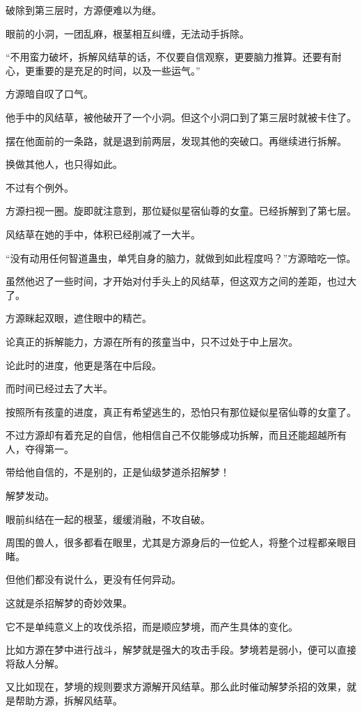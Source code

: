 \begin{this_body}
破除到第三层时，方源便难以为继。

眼前的小洞，一团乱麻，根茎相互纠缠，无法动手拆除。

“不用蛮力破坏，拆解风结草的话，不仅要自信观察，更要脑力推算。还要有耐心，更重要的是充足的时间，以及一些运气。”

方源暗自叹了口气。

他手中的风结草，被他破开了一个小洞。但这个小洞口到了第三层时就被卡住了。

摆在他面前的一条路，就是退到前两层，发现其他的突破口。再继续进行拆解。

换做其他人，也只得如此。

不过有个例外。

方源扫视一圈。旋即就注意到，那位疑似星宿仙尊的女童。已经拆解到了第七层。

风结草在她的手中，体积已经削减了一大半。

“没有动用任何智道蛊虫，单凭自身的脑力，就做到如此程度吗？”方源暗吃一惊。

虽然他迟了一些时间，才开始对付手头上的风结草，但这双方之间的差距，也过大了。

方源眯起双眼，遮住眼中的精芒。

论真正的拆解能力，方源在所有的孩童当中，只不过处于中上层次。

论此时的进度，他更是落在中后段。

而时间已经过去了大半。

按照所有孩童的进度，真正有希望逃生的，恐怕只有那位疑似星宿仙尊的女童了。

不过方源却有着充足的自信，他相信自己不仅能够成功拆解，而且还能超越所有人，夺得第一。

带给他自信的，不是别的，正是仙级梦道杀招解梦！

解梦发动。

眼前纠结在一起的根茎，缓缓消融，不攻自破。

周围的兽人，很多都看在眼里，尤其是方源身后的一位蛇人，将整个过程都亲眼目睹。

但他们都没有说什么，更没有任何异动。

这就是杀招解梦的奇妙效果。

它不是单纯意义上的攻伐杀招，而是顺应梦境，而产生具体的变化。

比如方源在梦中进行战斗，解梦就是强大的攻击手段。梦境若是弱小，便可以直接将敌人分解。

又比如现在，梦境的规则要求方源解开风结草。那么此时催动解梦杀招的效果，就是帮助方源，拆解风结草。


\end{this_body}
